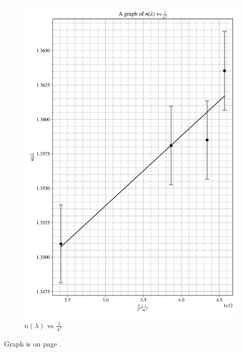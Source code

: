 \documentclass[12pt, a4paper]{article}
\begin{document}
\begin{figure}
    \centering
    \includegraphics[width = \textwidth]{Plot1.png}
    \caption{$n(\lambda)$ vs $\frac{1}{\lambda^2}$}
    \label{fig:Plot}
\end{figure}

Graph is on page \pageref{fig:Plot}.
\end{document}

